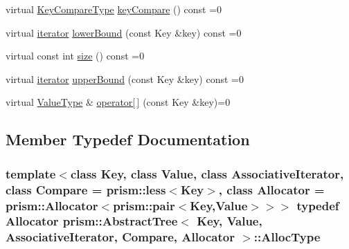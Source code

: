 \begin{DoxyCompactItemize}
virtual \hyperlink{classprism_1_1_abstract_tree_ad26cf2f1010ba3e5bdf74ba773b0afb1}{Key\+Compare\+Type} \hyperlink{classprism_1_1_abstract_tree_ae67686bf3cfd721c038d8f22f5f157b6}{key\+Compare} () const  =0
\item 
virtual \hyperlink{classprism_1_1_abstract_tree_add0af156a67312ca397d703c531e32fd}{iterator} \hyperlink{classprism_1_1_abstract_tree_a1bde627fcacadc69aa36b3f2c986e1d7}{lower\+Bound} (const Key \&key) const  =0
\item 
virtual const int \hyperlink{classprism_1_1_abstract_tree_adab50475261a20c17d4dcc772e294b38}{size} () const  =0
\item 
virtual \hyperlink{classprism_1_1_abstract_tree_add0af156a67312ca397d703c531e32fd}{iterator} \hyperlink{classprism_1_1_abstract_tree_ac04f91ccc489c39a6072fb28cafa9c35}{upper\+Bound} (const Key \&key) const  =0
\item 
virtual \hyperlink{classprism_1_1_abstract_tree_aeb1365316ef6bbaf6f7d33053a507707}{Value\+Type} \& \hyperlink{classprism_1_1_abstract_tree_ac05ea03c2295a4b85e15e1a41ed31206}{operator\mbox{[}$\,$\mbox{]}} (const Key \&key)=0
\end{DoxyCompactItemize}


\subsection{Member Typedef Documentation}
\subsubsection[{\texorpdfstring{Alloc\+Type}{AllocType}}]{\setlength{\rightskip}{0pt plus 5cm}template$<$class Key, class Value, class Associative\+Iterator, class Compare = prism\+::less$<$\+Key$>$, class Allocator = prism\+::\+Allocator$<$prism\+::pair$<$\+Key,\+Value$>$$>$$>$ typedef {\bf Allocator} {\bf prism\+::\+Abstract\+Tree}$<$ Key, Value, {\bf Associative\+Iterator}, Compare, {\bf Allocator} $>$\+::{\bf Alloc\+Type}}\hypertarget{classprism_1_1_abstract_tree_a88f27ac6f626ae6f4282546765a11bf6}{}\label{classprism_1_1_abstract_tree_a88f27ac6f626ae6f4282546765a11bf6}
